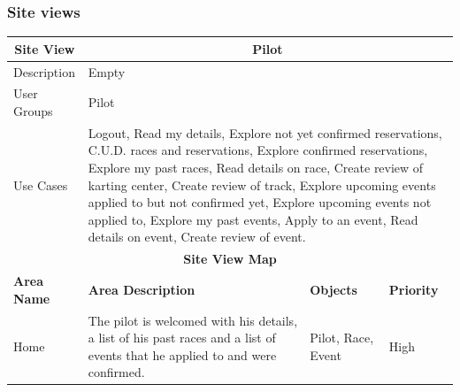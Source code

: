\documentclass{beamer}
\begin{document}
\begin{frame}
    \frametitle{Site views}
    \begin{table}
        \centering
        \tiny
        \setlength{\tabcolsep}{1pt}
        \begin{tabular}{|m{2cm}|m{4cm}|m{3cm}|m{1cm}|}
        \hline
        \multicolumn{1}{|c|}{\textbf{Site View}} & \multicolumn{3}{c|}{\textbf{Pilot}} \\
        \hline
        Description & \multicolumn{3}{m{8cm}|}{Empty} \\
        \hline
        User Groups & \multicolumn{3}{m{8cm}|}{Pilot} \\
        \hline
        Use Cases & \multicolumn{3}{m{8cm}|}{Logout,
        Read my details, Explore not yet confirmed reservations, 
        C.U.D. races and reservations, Explore confirmed reservations, 
        Explore my past races, Read details on race, Create review of karting center, 
        Create review of track, Explore upcoming events applied to but not confirmed yet, 
        Explore upcoming events not applied to, Explore my past events, Apply to an event, 
        Read details on event, Create review of event.} \\
        \hline
        \multicolumn{4}{|c|}{\textbf{Site View Map}} \\
        \hline
        \textbf{Area Name} & \textbf{Area Description} & \textbf{Objects} & \textbf{Priority} \\
        \hline
        Home & The pilot is welcomed with his details, a list of his past races 
        and a list of events that he applied to and were confirmed.
         & Pilot, Race, Event & High \\
         \hline
        \end{tabular}
    \end{table}
\end{frame}
\end{document}
